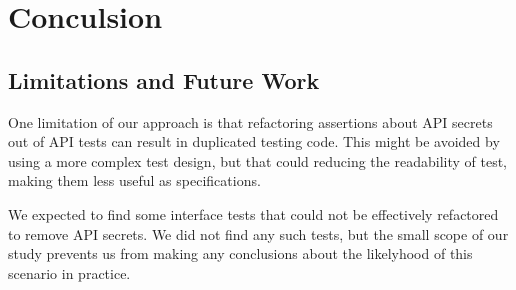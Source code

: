 \section{Conculsion} 

\subsection{Limitations and Future Work}
One limitation of our approach is that refactoring assertions about
API secrets out of API tests can result in duplicated testing
code. This might be avoided by using a more complex test design, but
that could reducing the readability of test, making them less useful
as specifications.

We expected to find some interface tests that could not be effectively
refactored to remove API secrets. We did not find any such tests, but
the small scope of our study prevents us from making any conclusions
about the likelyhood of this scenario in practice. 

